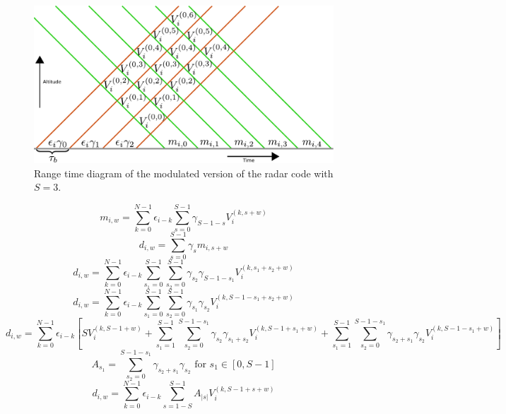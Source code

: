 \documentclass[18pt,a4paper]{extarticle}
\begin{document}
\begin{figure}
	\centering
	\includegraphics[width=1\linewidth]{code_diagram_modulated.pdf}
	\caption{Range time diagram of the modulated version of the radar code with $S=3$.}
	\label{fig:modulated}
\end{figure}
\begin{equation}
m_{i,w} = \sum_{k=0}^{N-1} \epsilon_{i-k} \sum_{s=0}^{S-1} \gamma_{S-1-s} V^{(k, s + w)}_{i}
\end{equation}
\begin{equation}
d_{i,w} = \sum^{S-1}_{s=0} \gamma_{s} m_{i, s + w}
\end{equation}
\begin{equation}
d_{i,w} = \sum_{k=0}^{N-1}\epsilon_{i-k} \sum_{s_1=0}^{S-1} \sum^{S-1}_{s_2=0} \gamma_{s_2} \gamma_{S-1-s_1} V_i^{(k, s_1 + s_2 + w)}
\end{equation}
\begin{equation}
d_{i,w} = \sum_{k=0}^{N-1}\epsilon_{i-k} \sum_{s_1=0}^{S-1} \sum^{S-1}_{s_2=0} \gamma_{s_1} \gamma_{s_2} V_i^{(k, S - 1 - s_1 + s_2 + w)}
\end{equation}
\begin{equation}
d_{i,w} = \sum_{k=0}^{N-1}\epsilon_{i-k}\left[SV_i^{(k, S - 1 + w)}
+ \sum_{s_1=1}^{S-1} \sum^{S-1-s_1}_{s_2=0} \gamma_{s_2} \gamma_{s_1 + s_2} V_i^{(k, S - 1 + s_1 + w)}
+ \sum_{s_1=1}^{S-1} \sum^{S-1-s_1}_{s_2=0} \gamma_{s_2+s_1} \gamma_{s_2} V_i^{(k, S - 1 - s_1 + w)} \right]
\end{equation}
\begin{equation}
A_{s_1} = \sum^{S-1-s_1}_{s_2=0} \gamma_{s_2+s_1} \gamma_{s_2}\text{ for }s_1\in[0, S-1]
\end{equation}
\begin{equation}
d_{i,w} = \sum_{k=0}^{N-1}\epsilon_{i-k}\sum_{s=1-S}^{S-1} A_{|s|} V_i^{(k, S - 1 + s + w)}
\end{equation}
\end{document}
